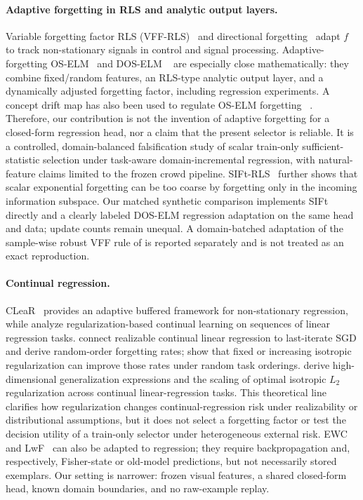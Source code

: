 \documentclass[10pt]{article}
\begin{document}
\paragraph{Adaptive forgetting in RLS and analytic output layers.}
Variable forgetting factor RLS (VFF-RLS)~\citep{leung1993vff} and
directional forgetting~\citep{kulhavy1987directional} adapt $f$ to
track non-stationary signals in control and signal processing.
Adaptive-forgetting OS-ELM~\citep{lim2013affoselm} and DOS-ELM
~\citep{cao2019doselm} are especially close mathematically: they combine
fixed/random features, an RLS-type analytic output layer, and a dynamically
adjusted forgetting factor, including regression experiments.  A concept
drift map has also been used to regulate OS-ELM forgetting
~\citep{yu2019driftmap}.  Therefore, our contribution is not the invention of
adaptive forgetting for a closed-form regression head, nor a claim that the
present selector is reliable.  It is a controlled, domain-balanced
falsification study of scalar train-only sufficient-statistic selection under
task-aware domain-incremental regression, with natural-feature claims limited
to the frozen crowd pipeline.
SIFt-RLS~\citep{lai2024sift} further shows that scalar exponential
forgetting can be too coarse by forgetting only in the incoming information
subspace.  Our matched synthetic comparison implements SIFt directly and a
clearly labeled DOS-ELM regression adaptation on the same head and data; update
counts remain unequal.  A domain-batched adaptation of the sample-wise robust
VFF rule of \citet{paleologu2008vff} is reported separately and is not treated
as an exact reproduction.

\paragraph{Continual regression.}
CLeaR~\citep{he2021clear} provides an adaptive buffered framework for
non-stationary regression, while \citet{zhao2024statistical}
analyze regularization-based continual learning on sequences of linear
regression tasks.  \citet{evron2026rates} connect realizable continual linear
regression to last-iterate SGD and derive random-order forgetting rates;
\citet{levinstein2025optimal} show that fixed or increasing isotropic
regularization can improve those rates under random task orderings.
\citet{karpel2026optimal} derive
high-dimensional generalization expressions and the scaling of optimal
isotropic $L_2$ regularization across continual linear-regression tasks.  This
theoretical line clarifies how regularization changes continual-regression
risk under realizability or distributional assumptions, but it does not
select a forgetting factor or test the decision utility of a train-only
selector under heterogeneous external risk.  EWC~\citep{kirkpatrick2017ewc}
and LwF~\citep{li2017lwf}
can also be adapted to regression; they require backpropagation and,
respectively, Fisher-state or old-model predictions, but not necessarily
stored exemplars. Our setting is narrower: frozen visual features, a shared
closed-form head, known domain boundaries, and no raw-example replay.
\end{document}
